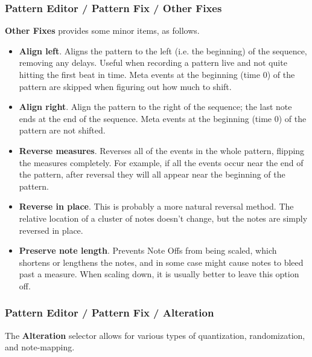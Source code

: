 \subsubsection{Pattern Editor / Pattern Fix / Other Fixes}
\label{subsubsection:patterns_fix_other_fixes}

   \textbf{Other Fixes} provides some minor items, as follows.

   \begin{itemize}
      \item \textbf{Align left}.
         Aligns the pattern to the left (i.e. the beginning)
         of the sequence, removing any delays.
         Useful when recording a pattern live and not quite
         hitting the first beat in time.
         Meta events at the beginning (time 0) of the pattern
         are skipped when figuring out how much to shift.
      \item \textbf{Align right}.
         Align the pattern to the right of the sequence;
         the last note ends at the end of the sequence.
         Meta events at the beginning (time 0) of the pattern
         are not shifted.
      \item \textbf{Reverse measures}.
         Reverses all of the events in the whole pattern, flipping the measures
         completely.  For example, if all the events occur near the end of the
         pattern, after reversal they will all appear near the beginning of the
         pattern.
      \item \textbf{Reverse in place}.
         This is probably a more natural reversal method.
         The relative location of a cluster of notes doesn't change, but the
         notes are simply reversed in place.
      \item \textbf{Preserve note length}.
         Prevents Note Offs from being scaled, which shortens or lengthens the
         notes, and in some case might cause notes to bleed past a measure.
         When scaling down, it is usually better to leave this option off.
   \end{itemize}

\subsubsection{Pattern Editor / Pattern Fix / Alteration}
\label{subsubsection:patterns_fix_alteration}

   The \textbf{Alteration} selector allows for various types of
   quantization, randomization, and note-mapping.

